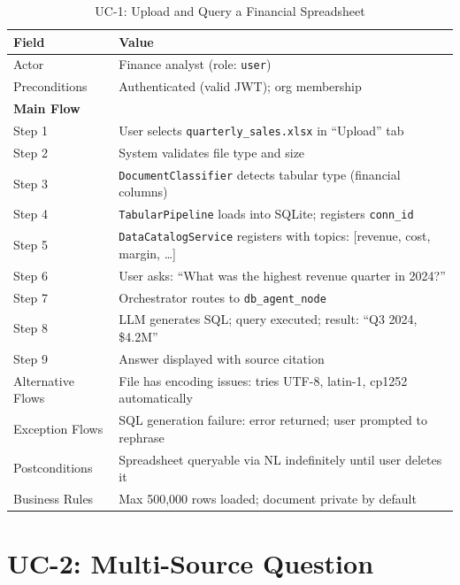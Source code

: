 \documentclass[12pt, a4paper, oneside]{report}
\newcommand{\kw}[1]{\texttt{\small #1}}
\begin{document}
\begin{table}[H]
\centering
{}
\begin{tabularx}{\linewidth}{lX}
\toprule
\rowcolor{rapidblue!10}
\textbf{Field} & \textbf{Value} \\
\midrule
Actor & Finance analyst (role: \kw{user}) \\
Preconditions & Authenticated (valid JWT); org membership \\
\midrule
\multicolumn{2}{l}{\textbf{Main Flow}} \\
Step 1 & User selects \kw{quarterly\_sales.xlsx} in ``Upload'' tab \\
Step 2 & System validates file type and size \\
Step 3 & \kw{DocumentClassifier} detects tabular type (financial columns) \\
Step 4 & \kw{TabularPipeline} loads into SQLite; registers \kw{conn\_id} \\
Step 5 & \kw{DataCatalogService} registers with topics: [revenue, cost, margin, \ldots] \\
Step 6 & User asks: ``What was the highest revenue quarter in 2024?'' \\
Step 7 & Orchestrator routes to \kw{db\_agent\_node} \\
Step 8 & LLM generates SQL; query executed; result: ``Q3 2024, \$4.2M'' \\
Step 9 & Answer displayed with source citation \\
\midrule
Alternative Flows & File has encoding issues: tries UTF-8, latin-1, cp1252 automatically \\
Exception Flows & SQL generation failure: error returned; user prompted to rephrase \\
Postconditions & Spreadsheet queryable via NL indefinitely until user deletes it \\
Business Rules & Max 500,000 rows loaded; document private by default \\
\bottomrule
\end{tabularx}
\caption{UC-1: Upload and Query a Financial Spreadsheet}
\end{table}

\section{UC-2: Multi-Source Question}
\end{document}
